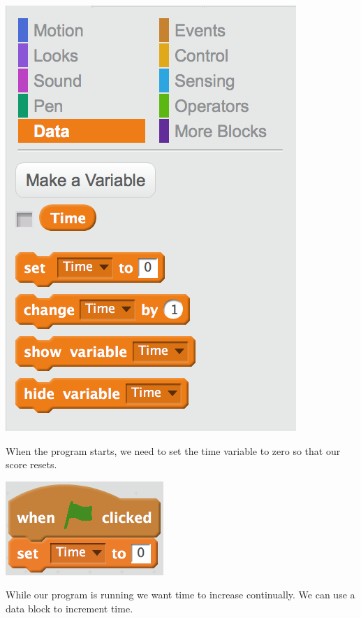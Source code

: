 \documentclass[12pt]{article}
\begin{document}
\begin{itemize}
		\begin{center}
			\item[] \includegraphics[scale=.80]{./Images/dragon12.png}
		\end{center}
		\item When the program starts, we need to set the time variable to zero so that our score resets.
		\begin{center}
			\item[] \includegraphics[scale=.50]{./Images/dragon13.png}
		\end{center}
		\newpage
		\item While our program is running we want time to increase continually. We can use a data block to increment time.
		\begin{center}

\end{center}
\end{itemize}
\end{document}
